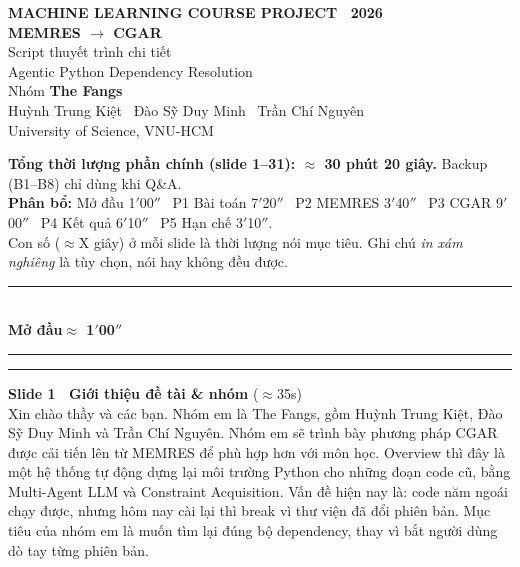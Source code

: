\documentclass[11pt]{article}
\newcommand{\parthead}[2]{%
  \vspace{1.4em}\par
  {\noindent\color{navydeep}\rule{\linewidth}{1.4pt}}\\[0.35em]
  {\bfseries\Large\color{navydeep}#1}\hfill{\normalsize\color{accent}\bfseries #2}\\[-0.35em]
  {\noindent\color{navydeep}\rule{\linewidth}{1.4pt}}
  \par\vspace{0.6em}%
}
\newcommand{\slidehead}[3]{%
  \vspace{1.05em}\par\noindent
  {\color{accent}\rule[-0.18em]{3pt}{1.05em}}\hspace{0.5em}%
  {\bfseries\large\color{navydeep}Slide #1 \textperiodcentered\ #2}%
  \hfill{\small\color{gray}(#3)}\\[0.25em]%
}
\begin{document}
\thispagestyle{empty}
\begin{center}
  \vspace*{2.2cm}
  {\small\color{accent}\bfseries MACHINE LEARNING COURSE PROJECT \textperiodcentered\ 2026}\\[1.4em]
  {\Huge\bfseries\color{navydeep} MEMRES $\to$ CGAR}\\[0.6em]
  {\Large\color{navydeep} Script thuyết trình chi tiết}\\[0.4em]
  {\large\color{gray} Agentic Python Dependency Resolution}\\[2.0em]
  {\large Nhóm \textbf{The Fangs}}\\[0.4em]
  {\normalsize Huỳnh Trung Kiệt \textperiodcentered\ Đào Sỹ Duy Minh \textperiodcentered\ Trần Chí Nguyên}\\[0.3em]
  {\small\color{gray} University of Science, VNU-HCM}\\[2.4em]

  \setlength{\fboxsep}{10pt}%
  \colorbox{softgray}{%
    \begin{minipage}{0.82\linewidth}
      \small
      \textbf{\color{navydeep}Tổng thời lượng phần chính (slide 1--31): $\approx$ 30 phút 20 giây.} Backup (B1--B8) chỉ dùng khi Q\&A.\\[0.5em]
      \textbf{Phân bổ:} Mở đầu 1$'$00$''$ \textperiodcentered\ P1 Bài toán 7$'$20$''$ \textperiodcentered\ P2 MEMRES 3$'$40$''$ \textperiodcentered\ P3 CGAR 9$'$00$''$ \textperiodcentered\ P4 Kết quả 6$'$10$''$ \textperiodcentered\ P5 Hạn chế 3$'$10$''$.\\[0.5em]
      {\color{gray}Con số ($\approx$X giây) ở mỗi slide là thời lượng nói mục tiêu. Ghi chú \emph{in xám nghiêng} là tùy chọn, nói hay không đều được.}
    \end{minipage}%
  }
\end{center}
\newpage

\parthead{Mở đầu}{$\approx$ 1$'$00$''$}

\slidehead{1}{Giới thiệu đề tài \& nhóm}{$\approx$35s}
Xin chào thầy và các bạn. Nhóm em là The Fangs, gồm Huỳnh Trung Kiệt, Đào Sỹ Duy Minh và Trần Chí Nguyên. Nhóm em sẽ trình bày phương pháp CGAR được cải tiến lên từ MEMRES để phù hợp hơn với môn học. Overview thì đây là một hệ thống tự động dựng lại môi trường Python cho những đoạn code cũ, bằng Multi-Agent LLM và Constraint Acquisition. Vấn đề hiện nay là: code năm ngoái chạy được, nhưng hôm nay cài lại thì break vì thư viện đã đổi phiên bản. Mục tiêu của nhóm em là muốn tìm lại đúng bộ dependency, thay vì bắt người dùng dò tay từng phiên bản.
\end{document}
